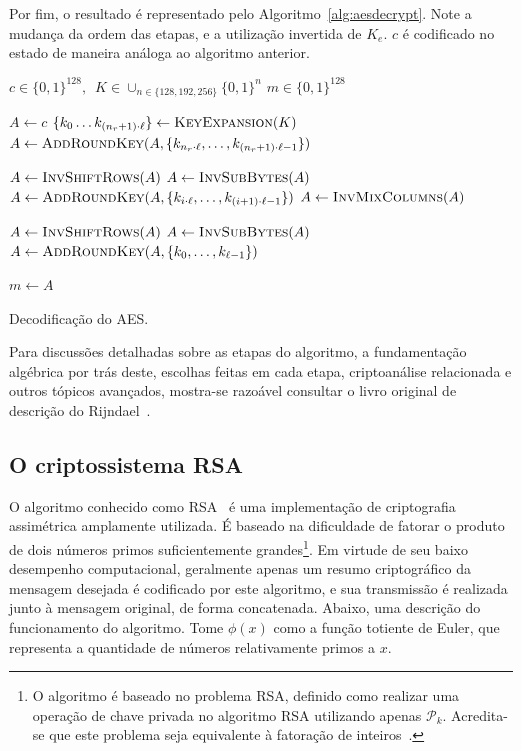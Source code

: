 \documentclass{ufsctex/ufsctex}
\newcommand{\pk}{\mathcal{P}_k}
\newcommand{\binwds}[1]{\{0, 1\}^{#1}}
\begin{document}
Por fim, o resultado é representado pelo Algoritmo~\ref{alg:aesdecrypt}. Note a
mudança da ordem das etapas, e a utilização invertida de $K_e$. $c$ é
codificado no estado de maneira análoga ao algoritmo anterior.

\begin{algorithm}
  \begin{algorithmic}
    \REQUIRE{}  $c \in \binwds{128}, \enspace
      K \in \cup_{n \in \{128, 192, 256\}} \binwds{n}$
    \ENSURE{}  $m \in \binwds{128}$ 

    \STATE{}  $A \leftarrow c$
    \STATE{}  $\{k_{0} \dots k_{(n_r + 1) \cdot \ell}\}
      \leftarrow \textsc{KeyExpansion}(K)$
    \STATE{}  $A \leftarrow \textsc{AddRoundKey}(A,
      \{k_{n_r \cdot \ell}, \dots, k_{(n_r + 1) \cdot \ell - 1}\})$

      \STATE{}  $A \leftarrow \textsc{InvShiftRows}(A)$
      \STATE{}  $A \leftarrow \textsc{InvSubBytes}(A)$
      \STATE{}  $A \leftarrow \textsc{AddRoundKey}(A,
        \{k_{i \cdot \ell}, \dots, k_{(i + 1) \cdot \ell - 1}\})$
      \STATE{}  $A \leftarrow \textsc{InvMixColumns}(A)$
    \ENDFOR{}

    \STATE{}  $A \leftarrow \textsc{InvShiftRows}(A)$
    \STATE{}  $A \leftarrow \textsc{InvSubBytes}(A)$
    \STATE{}  $A \leftarrow \textsc{AddRoundKey}(A,
      \{k_{0}, \dots, k_{\ell - 1}\})$

    \STATE{}  $m \leftarrow A$
  \end{algorithmic}
  \caption{Decodificação do AES.}\label{alg:aesdecrypt}
\end{algorithm}

Para discussões detalhadas sobre as etapas do algoritmo, a fundamentação
algébrica por trás deste, escolhas feitas em cada etapa, criptoanálise
relacionada e outros tópicos avançados, mostra-se razoável consultar
o livro original de descrição do Rijndael~\cite{Daemen:book:2002}.

\subsection{O criptossistema RSA}\label{subsection:rsa}

O algoritmo conhecido como
RSA~\cite{Rivest:article:1978:feb}
é uma implementação de criptografia assimétrica amplamente utilizada. É baseado
na dificuldade de fatorar o produto de dois números primos suficientemente
grandes\footnote{O algoritmo é baseado no problema RSA, definido como realizar
uma operação de chave privada no algoritmo RSA utilizando apenas $\pk{}$.
Acredita-se que este problema seja equivalente à fatoração de
inteiros~\cite[Fato 3.30]{Menezes:book:1996}.}. Em virtude de seu baixo
desempenho computacional, geralmente apenas um resumo criptográfico da mensagem
desejada é codificado por este algoritmo, e sua transmissão é realizada junto à
mensagem original, de forma concatenada. Abaixo, uma descrição do funcionamento
do algoritmo. Tome $\phi(x)$ como a função totiente de Euler, que representa a
quantidade de números relativamente primos a $x$.
\end{document}
